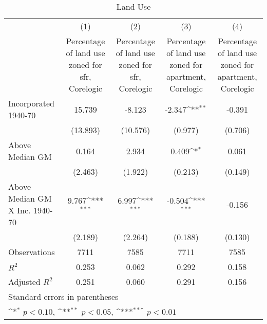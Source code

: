 \begin{table}[htbp]\centering
\def\sym#1{\ifmmode^{#1}\else\(^{#1}\)\fi}
\caption{Land Use}
\begin{tabular}{l*{4}{c}}
\hline\hline
                    &\multicolumn{1}{c}{(1)}&\multicolumn{1}{c}{(2)}&\multicolumn{1}{c}{(3)}&\multicolumn{1}{c}{(4)}\\
                    &\multicolumn{1}{c}{Percentage of land use zoned for sfr, Corelogic}&\multicolumn{1}{c}{Percentage of land use zoned for sfr, Corelogic}&\multicolumn{1}{c}{Percentage of land use zoned for apartment, Corelogic}&\multicolumn{1}{c}{Percentage of land use zoned for apartment, Corelogic}\\
\hline
Incorporated 1940-70&      15.739         &      -8.123         &      -2.347\sym{**} &      -0.391         \\
                    &    (13.893)         &    (10.576)         &     (0.977)         &     (0.706)         \\
[1em]
Above Median GM     &       0.164         &       2.934         &       0.409\sym{*}  &       0.061         \\
                    &     (2.463)         &     (1.922)         &     (0.213)         &     (0.149)         \\
[1em]
Above Median GM X Inc. 1940-70&       9.767\sym{***}&       6.997\sym{***}&      -0.504\sym{***}&      -0.156         \\
                    &     (2.189)         &     (2.264)         &     (0.188)         &     (0.130)         \\
\hline
Observations        &        7711         &        7585         &        7711         &        7585         \\
\(R^{2}\)           &       0.253         &       0.062         &       0.292         &       0.158         \\
Adjusted \(R^{2}\)  &       0.251         &       0.060         &       0.291         &       0.156         \\
\hline\hline
\multicolumn{5}{l}{\footnotesize Standard errors in parentheses}\\
\multicolumn{5}{l}{\footnotesize \sym{*} \(p<0.10\), \sym{**} \(p<0.05\), \sym{***} \(p<0.01\)}\\
\end{tabular}
\end{table}
